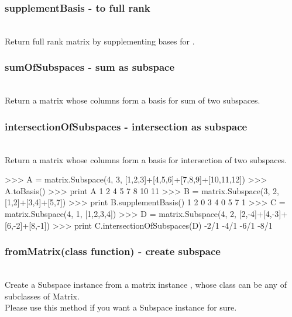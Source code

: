   \subsubsection{supplementBasis - to full rank}
   \\
   \spacing
   \quad Return full rank matrix by supplementing bases for .\\
   \spacing
  \subsubsection{sumOfSubspaces - sum as subspace}
   \\
   \spacing
   \quad Return a matrix whose columns form a basis for sum of two subspaces.\\
   \spacing
  \subsubsection{intersectionOfSubspaces - intersection as subspace}
   \\
   \spacing
   \quad Return a matrix whose columns form a basis for intersection of two subspaces.\\
   \spacing
\begin{ex}
>>> A = matrix.Subspace(4, 3, [1,2,3]+[4,5,6]+[7,8,9]+[10,11,12])
>>> A.toBasis()
>>> print A
 1  2
 4  5
 7  8
10 11
>>> B = matrix.Subspace(3, 2, [1,2]+[3,4]+[5,7])
>>> print B.supplementBasis()
1 2 0
3 4 0
5 7 1
>>> C = matrix.Subspace(4, 1, [1,2,3,4])
>>> D = matrix.Subspace(4, 2, [2,-4]+[4,-3]+[6,-2]+[8,-1])
>>> print C.intersectionOfSubspaces(D)
-2/1
-4/1
-6/1
-8/1
\end{ex}
\C

 \subsubsection{fromMatrix(class function) - create subspace}
   \\
   \spacing
   \quad Create a Subspace instance from a matrix instance , whose class can be any of subclasses of Matrix.\\
   \spacing
   \quad Please use this method if you want a Subspace instance for sure.\\
   \spacing
\C


